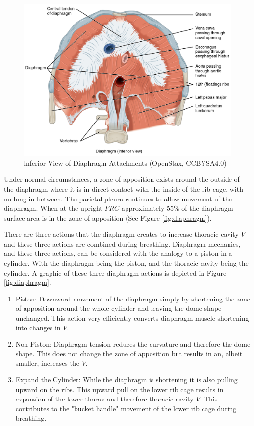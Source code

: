\begin{figure}
    \centering
    \includegraphics[width=0.75 \linewidth]{./figure/ventilation/diaphragm_inferior.jpg}
    \caption{Inferior View of Diaphragm Attachments \footnotesize{(OpenStax, CCBYSA4.0)}}
    \label{fig:diaphragm_inferior}
\end{figure}

Under normal circumstances, a zone of apposition exists around the outside of the diaphragm where it is in direct contact with the inside of the rib cage, with no lung in between. The parietal pleura continues to allow movement of the diaphragm. When at the upright $FRC$ approximately 55\% of the diaphragm surface area is in the zone of apposition (See Figure \ref{fig:diaphragm}).

There are three actions that the diaphragm creates to increase thoracic cavity $V$ and these three actions are combined during breathing. Diaphragm mechanics, and these three actions, can be considered with the analogy to a piston in a cylinder. With the diaphragm being the piston, and the thoracic cavity being the cylinder. A graphic of these three diaphragm actions is depicted in Figure \ref{fig:diaphragm}. 

\begin{enumerate}
    \item Piston: Downward movement of the diaphragm simply by shortening the zone of apposition around the whole cylinder and leaving the dome shape unchanged. This action very efficiently converts diaphragm muscle shortening into changes in $V$.
    \item Non Piston: Diaphragm tension reduces the curvature and therefore the dome shape. This does not change the zone of apposition but results in an, albeit smaller, increases the $V$.
    \item Expand the Cylinder: While the diaphragm is shortening it is also pulling upward on the ribs. This upward pull on the lower rib cage results in expansion of the lower thorax and therefore thoracic cavity $V$. This contributes to the "bucket handle" movement of the lower rib cage during breathing.
\end{enumerate}

